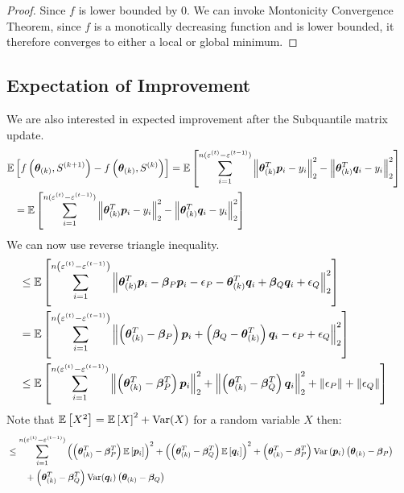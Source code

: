 \documentclass{article} %
\newcommand{\norm}[1]{\left\lVert#1\right\rVert}
\begin{document}
\begin{appendices}
\begin{proof}
	Since $f$ is lower bounded by $0$. We can invoke Montonicity Convergence Theorem, since $f$ is a monotically decreasing function and is lower bounded, it therefore converges to either a local or global minimum. 
	\end{proof}
	
	\subsection{Expectation of Improvement}
	We are also interested in expected improvement after the Subquantile matrix update. 
	\begin{align*}
		\mathbb{E}&\left[f\left(\vtheta_{(k)}, S^{(k+1)}\right) - f\left(\vtheta_{(k)}, S^{(k)}\right)\right] = \mathbb{E}\left[\sum_{i=1}^{n(\varepsilon^{(t)}-\varepsilon^{(t-1)})}\norm{\vtheta_{(k)}^T\vp_i -y_i}_2^2 - \norm{\vtheta_{(k)}^T\vq_i - y_i}_2^2\right] &&\\
		&= \mathbb{E}\left[\sum_{i=1}^{n(\varepsilon^{(t)}-\varepsilon^{(t-1)})}\norm{\vtheta_{(k)}^T\vp_i -y_i}_2^2 - \norm{\vtheta_{(k)}^T\vq_i - y_i}_2^2\right] &&
	\end{align*}
	We can now use reverse triangle inequality.
	\begin{align*}
		&\leq  \mathbb{E}\left[\sum_{i=1}^{n\left(\varepsilon^{(t)}-\varepsilon^{(t-1)}\right)}\norm{\vtheta_{(k)}^T\vp_i - \vbeta_P\vp_i - \eps_P - \vtheta^T_{(k)}\vq_i + \vbeta_Q\vq_i + \eps_Q}_2^2 \right] &&\\
		&=  \mathbb{E}\left[\sum_{i=1}^{n\left(\varepsilon^{(t)}-\varepsilon^{(t-1)}\right)}\norm{\left(\vtheta^T_{(k)} - \vbeta_P\right)\vp_i + \left(\vbeta_Q - \vtheta^T_{(k)}\right)\vq_i - \eps_P+ \eps_Q}_2^2 \right] &&\\
		&\leq \mathbb{E}\left[\sum_{i=1}^{n(\varepsilon^{(t)} - \varepsilon^{(t-1)})}\norm{\left(\vtheta_{(k)}^T - \vbeta_P^T\right)\vp_i}_2^2 + \norm{\left(\vtheta_{(k)}^T - \vbeta_Q^T\right)\vq_i}_2^2 + \norm{\eps_P} + \norm{\eps_Q}\right]
	\end{align*}
	Note that $\mathbb{E}\left[X^2\right] = \mathbb{E}\left[X\right]^2 + \mathrm{Var}(X)$ for a random variable $X$ then:
	\begin{align*}
		&\leq \sum_{i=1}^{n(\varepsilon^{(t)} - \varepsilon^{(t-1)})} \left(\left(\vtheta_{(k)}^T - \vbeta_P^T\right)\mathbb{E}\left[\vp_i\right]\right)^2 + \left(\left(\vtheta_{(k)}^T - \vbeta_Q^T\right)\mathbb{E}\left[\vq_i\right]\right)^2 + \left(\vtheta_{(k)}^T - \vbeta_P^T\right)\Var\left(\vp_i\right)\left(\vtheta_{(k)} - \vbeta_P\right) \notag\\ &\qquad+ \left(\vtheta_{(k)}^T - \vbeta_Q^T\right)\Var(\vq_i)\left(\vtheta_{(k)} - \vbeta_Q\right) &&\\

\end{align*}
\end{appendices}
\end{document}
